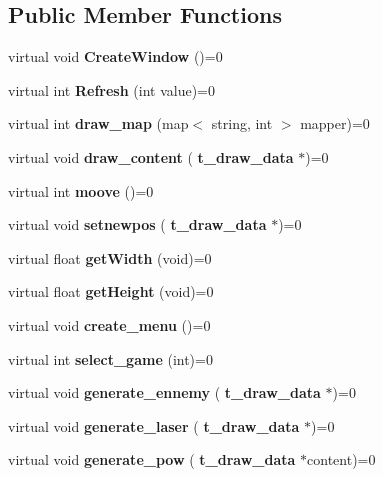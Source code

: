 \subsection*{Public Member Functions}
\begin{DoxyCompactItemize}
\item 
\mbox{\label{class_i_display_module_a995de9dca9660bfdcaa5307f473e672c}} 
virtual void {\bfseries Create\+Window} ()=0
\item 
\mbox{\label{class_i_display_module_a95c05ec4c3c59321c67f7b3a9d438dcc}} 
virtual int {\bfseries Refresh} (int value)=0
\item 
\mbox{\label{class_i_display_module_a9952028053323ae0c4841991bc78cf29}} 
virtual int {\bfseries draw\+\_\+map} (map$<$ string, int $>$ mapper)=0
\item 
\mbox{\label{class_i_display_module_ab5d4dce7e501cecaedd6432dd3d82910}} 
virtual void {\bfseries draw\+\_\+content} (\textbf{ t\+\_\+draw\+\_\+data} $\ast$)=0
\item 
\mbox{\label{class_i_display_module_abed5ec651d2c12334c33dff062184dee}} 
virtual int {\bfseries moove} ()=0
\item 
\mbox{\label{class_i_display_module_a1131abc4609bd965e5d598da4d572532}} 
virtual void {\bfseries setnewpos} (\textbf{ t\+\_\+draw\+\_\+data} $\ast$)=0
\item 
\mbox{\label{class_i_display_module_a9e7a55e19b6b5da5f403ec206871f7d8}} 
virtual float {\bfseries get\+Width} (void)=0
\item 
\mbox{\label{class_i_display_module_ad4c80704672cf4217fa144fb0d905e16}} 
virtual float {\bfseries get\+Height} (void)=0
\item 
\mbox{\label{class_i_display_module_acfe514ad0bc31d00a9e092fe8d47324b}} 
virtual void {\bfseries create\+\_\+menu} ()=0
\item 
\mbox{\label{class_i_display_module_a7b730b2a68c4f8d21b79a7788b169468}} 
virtual int {\bfseries select\+\_\+game} (int)=0
\item 
\mbox{\label{class_i_display_module_a8ed6fec6d9c16f0444b7cdadad0f1309}} 
virtual void {\bfseries generate\+\_\+ennemy} (\textbf{ t\+\_\+draw\+\_\+data} $\ast$)=0
\item 
\mbox{\label{class_i_display_module_ad4ec94dc50603d37333d704a3488cfbb}} 
virtual void {\bfseries generate\+\_\+laser} (\textbf{ t\+\_\+draw\+\_\+data} $\ast$)=0
\item 
\mbox{\label{class_i_display_module_afa2cba3aa5b542fe047525ff970f0847}} 
virtual void {\bfseries generate\+\_\+pow} (\textbf{ t\+\_\+draw\+\_\+data} $\ast$content)=0
\end{DoxyCompactItemize}
